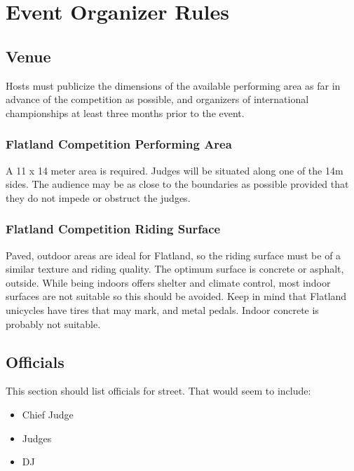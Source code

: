 \chapter{Event Organizer Rules}

\section{Venue}

Hosts must publicize the dimensions of the available performing area as far in advance of the competition as possible, and organizers of international championships at least three months prior to the event.

\subsection{Flatland Competition Performing Area \label{sec:flat-street_flatland-performing-area}}
A 11 x 14 meter area is required.
Judges will be situated along one of the 14m sides.
The audience may be as close to the boundaries as possible provided that they do not impede or obstruct the judges.

\subsection{Flatland Competition Riding Surface}
Paved, outdoor areas are ideal for Flatland, so the riding surface must be of a similar texture and riding quality.
The optimum surface is concrete or asphalt, outside.
While being indoors offers shelter and climate control, most indoor surfaces are not suitable so this should be avoided.
Keep in mind that Flatland unicycles have tires that may mark, and metal pedals. Indoor concrete is probably not suitable.

\section{Officials}

\begin{framed}
This section should list officials for street.  That would seem to include:
\begin{itemize}
\item Chief Judge
\item Judges
\item DJ
\end{itemize}
\end{framed}

